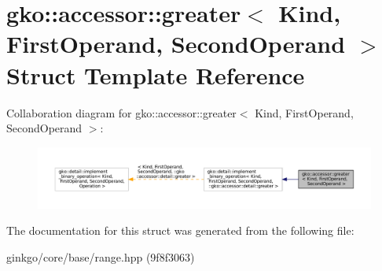 \hypertarget{structgko_1_1accessor_1_1greater}{}\section{gko\+:\+:accessor\+:\+:greater$<$ Kind, First\+Operand, Second\+Operand $>$ Struct Template Reference}
\label{structgko_1_1accessor_1_1greater}


Collaboration diagram for gko\+:\+:accessor\+:\+:greater$<$ Kind, First\+Operand, Second\+Operand $>$\+:
\nopagebreak
\begin{figure}[H]
\begin{center}
\leavevmode
\includegraphics[width=350pt]{structgko_1_1accessor_1_1greater__coll__graph}
\end{center}
\end{figure}


The documentation for this struct was generated from the following file\+:\begin{DoxyCompactItemize}
\item 
ginkgo/core/base/range.\+hpp (9f8f3063)\end{DoxyCompactItemize}
